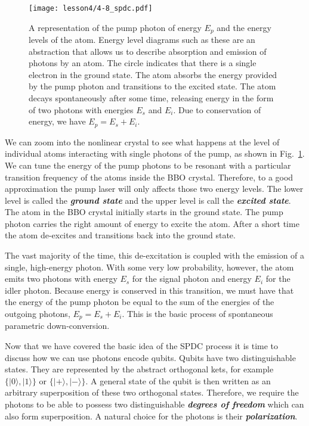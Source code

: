 \begin{figure}[t]
    \centering
    \texttt{[image: lesson4/4-8\_spdc.pdf]}
    \caption[pump photon and the energy levels of the atom]{A representation of the pump photon of energy $E_p$ and the energy levels of the atom. Energy level diagrams such as these are an abstraction that allows us to describe absorption and emission of photons by an atom. The circle indicates that there is a single electron in the ground state.
    The atom absorbs the energy provided by the pump photon and transitions to the excited state. The atom decays spontaneously after some time, releasing energy in the form of two photons with energies $E_s$ and $E_i$. Due to conservation of energy, we have $E_p = E_s + E_i$.}
    \label{fig:spdc-energy-levels}
\end{figure}

We can zoom into the nonlinear crystal to see what happens at the level of individual atoms interacting with single photons of the pump, as shown in Fig.~\ref{fig:spdc-energy-levels}.
We can tune the energy of the pump photons to be resonant with a particular transition frequency of the atoms inside the BBO crystal.
Therefore, to a good approximation the pump laser will only affects those two energy levels.
The lower level is called the \textbf{\emph{ground state}} and the upper level is call the \textbf{\emph{excited state}}.
The atom in the BBO crystal initially starts in the ground state.
The pump photon carries the right amount of energy to excite the atom.
After a short time the atom de-excites and transitions back into the ground state.

The vast majority of the time, this de-excitation is coupled with the emission of a single, high-energy photon.
With some very low probability, however, the atom emits two photons with energy $E_s$ for the signal photon and energy $E_i$ for the idler photon.
Because energy is conserved in this transition, we must have that the energy of the pump photon be equal to the sum of the energies of the outgoing photons, $E_p = E_s + E_i$.
This is the basic process of spontaneous parametric down-conversion.

Now that we have covered the basic idea of the SPDC process it is time to discuss how we can use photons encode qubits.
Qubits have two distinguishable states.
They are represented by the abstract orthogonal kets, for example $\{|0\rangle,|1\rangle\}$ or $\{|+\rangle,|-\rangle\}$.
A general state of the qubit is then written as an arbitrary superposition of these two orthogonal states.
Therefore, we require the photons to be able to possess two distinguishable \textbf{\emph{degrees of freedom}} which can also form superposition.
A natural choice for the photons is their \textbf{\emph{polarization}}.

